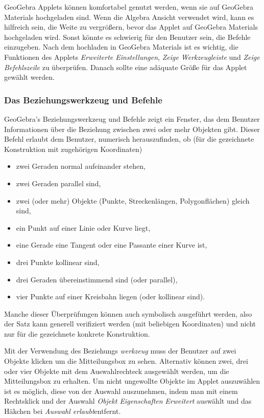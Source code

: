 \documentclass{article}
\begin{document}
GeoGebra Applets können komfortabel genutzt werden, wenn sie auf GeoGebra Materials hochgeladen  sind.
Wenn die Algebra Ansicht verwendet wird, kann es hilfreich sein, die Weite zu vergrößern, bevor das Applet auf GeoGebra Materials hochgeladen wird. Sonst könnte es schwierig für den Benutzer sein, die Befehle einzugeben. Nach dem hochladen in GeoGebra Materials ist es wichtig, die Funktionen des Applets  \textit{Erweiterte Einstellungen},  \textit{Zeige Werkzeugleiste} und \textit{Zeige Befehlszeile} zu überprüfen. Danach sollte eine adäquate Größe für das Applet gewählt werden.


\subsubsection{Das Beziehungswerkzeug und Befehle}

GeoGebra's Beziehungswerkzeug und Befehle zeigt ein Fenster, das dem Benutzer Informationen über die Beziehung zwischen zwei oder mehr Objekten gibt.
Dieser Befehl erlaubt dem Benutzer, numerisch herauszufinden, ob (für die gezeichnete Konstruktion mit zugehörigen Koordinaten)
\begin{itemize}
    \item zwei Geraden normal aufeinander stehen,
    \item zwei Geraden parallel sind,
    \item zwei (oder mehr) Objekte (Punkte, Streckenlängen, Polygonflächen) gleich sind,
    \item ein Punkt auf einer Linie oder Kurve liegt,
    \item eine Gerade eine Tangent oder eine Passante einer Kurve ist,
    \item drei Punkte kollinear sind,
    \item drei Geraden übereinstimmend sind (oder parallel),
    \item vier Punkte auf einer Kreisbahn liegen (oder kollinear sind).
\end{itemize}
Manche dieser Überprüfungen können auch symbolisch ausgeführt werden, also der Satz kann generell verifiziert werden (mit beliebigen Koordinaten) und nicht nur für die gezeichnete konkrete Konstruktion.

Mit der Verwendung des Beziehungs \textit{werkzeug} muss der Benutzer auf zwei Objekte klicken um die Mitteilungsbox zu sehen. Alternativ können zwei, drei oder vier Objekte mit dem Auswahlrechteck ausgewählt werden, um die Mitteilungsbox zu erhalten. Um nicht ungewollte Objekte im Applet auszuwählen ist es möglich, diese von der Auswahl auszunehmen, indem man mit einem Rechtsklick und der Auswahl \textit{Objekt Eigenschaften} \textit{Erweitert} auswählt und das Häkchen bei \textit{Auswahl erlaubt}entfernt.
\end{document}
